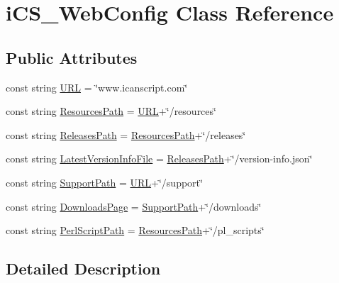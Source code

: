 \hypertarget{classi_c_s___web_config}{\section{i\+C\+S\+\_\+\+Web\+Config Class Reference}
\label{classi_c_s___web_config}
}
\subsection*{Public Attributes}
\begin{DoxyCompactItemize}
\item 
const string \hyperlink{classi_c_s___web_config_aacbcdf2adb3b138c8169d647adf32b90}{U\+R\+L} = \char`\"{}www.\+icanscript.\+com\char`\"{}
\item 
const string \hyperlink{classi_c_s___web_config_ab6ae9a366d579574b96f274beeec701b}{Resources\+Path} = \hyperlink{classi_c_s___web_config_aacbcdf2adb3b138c8169d647adf32b90}{U\+R\+L}+\char`\"{}/resources\char`\"{}
\item 
const string \hyperlink{classi_c_s___web_config_aa91ba3ed91c00bdad22566a78d692c6c}{Releases\+Path} = \hyperlink{classi_c_s___web_config_ab6ae9a366d579574b96f274beeec701b}{Resources\+Path}+\char`\"{}/releases\char`\"{}
\item 
const string \hyperlink{classi_c_s___web_config_a6ede3973db0f9291b83b1b5841289bad}{Latest\+Version\+Info\+File} = \hyperlink{classi_c_s___web_config_aa91ba3ed91c00bdad22566a78d692c6c}{Releases\+Path}+\char`\"{}/version-\/info.\+json\char`\"{}
\item 
const string \hyperlink{classi_c_s___web_config_ab6cc3cf3da2ae106f6fc04e5ee35d634}{Support\+Path} = \hyperlink{classi_c_s___web_config_aacbcdf2adb3b138c8169d647adf32b90}{U\+R\+L}+\char`\"{}/support\char`\"{}
\item 
const string \hyperlink{classi_c_s___web_config_a435a59ac9781685e18003005c08e3160}{Downloads\+Page} = \hyperlink{classi_c_s___web_config_ab6cc3cf3da2ae106f6fc04e5ee35d634}{Support\+Path}+\char`\"{}/downloads\char`\"{}
\item 
const string \hyperlink{classi_c_s___web_config_aa51c9dd66fb2c11646040164361cfbd8}{Perl\+Script\+Path} = \hyperlink{classi_c_s___web_config_ab6ae9a366d579574b96f274beeec701b}{Resources\+Path}+\char`\"{}/pl\+\_\+scripts\char`\"{}
\end{DoxyCompactItemize}


\subsection{Detailed Description}


